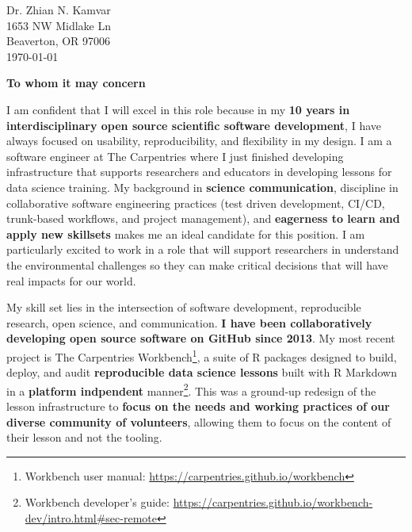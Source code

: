 


\clearpage
\begin{flushright}
  Dr. Zhian N. Kamvar\\
  1653 NW Midlake Ln\\
  Beaverton, OR 97006\\
  \today
\end{flushright}

\textbf{To whom it may concern}

\vspace{2ex}

I am confident that I will excel in
this role because in my \textbf{10 years in interdisciplinary open source
scientific software development}, I have always focused on usability,
reproducibility, and flexibility in my design.
I am a software engineer at The Carpentries where I just finished developing
infrastructure that supports researchers and educators in developing lessons
for data science training. 
My background in \textbf{science communication}, discipline in collaborative
software engineering practices (test driven development, CI/CD, trunk-based
workflows, and project management), and \textbf{eagerness to learn and apply
new skillsets} makes me an ideal candidate for this position. 
I am particularly excited to work in a role that will support researchers in
understand the environmental challenges so they can make critical decisions
that will have real impacts for our world.

\vspace{2ex}

My skill set lies in the intersection of software development,
reproducible research, open science, and communication. 
\textbf{I have been collaboratively developing open source software on GitHub
since 2013}.
My most recent project is The Carpentries Workbench\footnote{Workbench user manual: \url{https://carpentries.github.io/workbench}}, 
a suite of R packages designed to build, deploy, and audit \textbf{reproducible
data science lessons} built with R Markdown in a \textbf{platform indpendent} manner\footnote{Workbench developer's guide: \url{https://carpentries.github.io/workbench-dev/intro.html\#sec-remote}}.
This was a ground-up redesign of the lesson infrastructure to \textbf{focus on
the needs and working practices of our diverse community of volunteers},
allowing them to focus on the content of their lesson and not the tooling.

